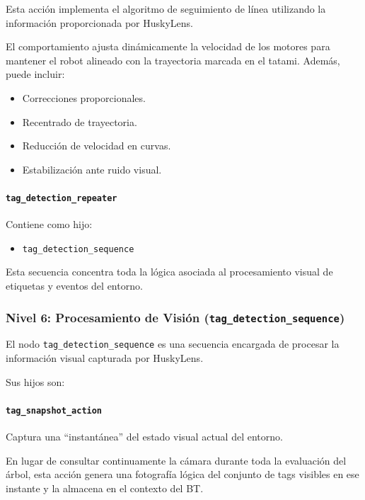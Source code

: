 \documentclass{prgrado}
\begin{document}
Esta acción implementa el algoritmo de seguimiento de línea utilizando la información proporcionada por HuskyLens.

El comportamiento ajusta dinámicamente la velocidad de los motores para mantener el robot alineado con la trayectoria marcada en el tatami. Además, puede incluir:

\begin{itemize}
    \item Correcciones proporcionales.
    \item Recentrado de trayectoria.
    \item Reducción de velocidad en curvas.
    \item Estabilización ante ruido visual.
\end{itemize}

\paragraph{\texttt{tag\_detection\_repeater}}

Contiene como hijo:

\begin{itemize}
    \item \texttt{tag\_detection\_sequence}
\end{itemize}

Esta secuencia concentra toda la lógica asociada al procesamiento visual de etiquetas y eventos del entorno.

\subsubsection{Nivel 6: Procesamiento de Visión (\texttt{tag\_detection\_sequence})}

El nodo \texttt{tag\_detection\_sequence} es una secuencia encargada de procesar la información visual capturada por HuskyLens.

Sus hijos son:

\paragraph{\texttt{tag\_snapshot\_action}}

Captura una ``instantánea'' del estado visual actual del entorno.

En lugar de consultar continuamente la cámara durante toda la evaluación del árbol, esta acción genera una fotografía lógica del conjunto de tags visibles en ese instante y la almacena en el contexto del BT.
\end{document}
